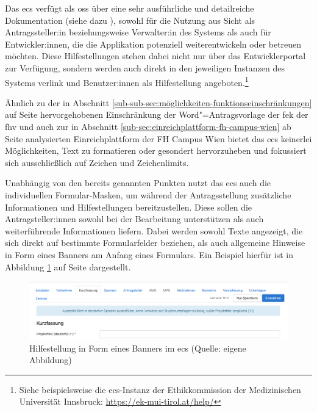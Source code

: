\documentclass[a4paper,12pt,twoside]{scrreprt}
\begin{document}
Das \acl{ecs} verfügt als \ac{oss} über eine sehr ausführliche und detailreiche Dokumentation (siehe dazu \cite{medizinische_universitat_wien_ecs_2021-1, medizinische_universitat_wien_development_2021, medizinische_universitat_wien_installationusage_2021, medizinische_universitat_wien_ecs_2021, ethics_commission_system_organization_ecs_2021}), sowohl für die Nutzung aus Sicht als Antragssteller:in beziehungsweise Verwalter:in des Systems als auch für Entwickler:innen, die die Applikation potenziell weiterentwickeln oder betreuen möchten. Diese Hilfestellungen stehen dabei nicht nur über das Entwicklerportal zur Verfügung, sondern werden auch direkt in den jeweiligen Instanzen des Systems verlink und Benutzer:innen als Hilfestellung angeboten.\footnote{Siehe beispielsweise die \ac{ecs}-Instanz der Ethikkommission der Medizinischen Universität Innsbruck: \url{https://ek-mui-tirol.at/help/}}

\medskip

Ähnlich zu der in Abschnitt \ref{sub-sub-sec:möglichkeiten-funktionseinschränkungen} auf Seite \pageref{sub-sub-sec:möglichkeiten-funktionseinschränkungen} hervorgehobenen Einschränkung der Word"=Antragsvorlage der \ac{fek} der \ac{fhv} und auch zur in Abschnitt \ref{sub-sec:einreichplattform-fh-campus-wien} ab Seite \pageref{sub-sec:einreichplattform-fh-campus-wien} analysierten Einreichplattform der FH Campus Wien bietet das \acl{ecs} keinerlei Möglichkeiten, Text zu formatieren oder gesondert hervorzuheben und fokussiert sich ausschließlich auf Zeichen und Zeichenlimits.

\medskip

Unabhängig von den bereits genannten Punkten nutzt das \ac{ecs} auch die individuellen Formular-Masken, um während der Antragsstellung zusätzliche Informationen und Hilfestellungen bereitzustellen. Diese sollen die Antragsteller:innen sowohl bei der Bearbeitung unterstützen als auch weiterführende Informationen liefern. Dabei werden sowohl Texte angezeigt, die sich direkt auf bestimmte Formularfelder beziehen, als auch allgemeine Hinweise in Form eines Banners am Anfang eines Formulars. Ein Beispiel hierfür ist in Abbildung \ref{fig:ecs-banner-hilfestellung} auf Seite \pageref{fig:ecs-banner-hilfestellung} dargestellt.

\begin{figure}[ht]
    \centering
    \includegraphics[width=\linewidth]{thesis/images/Luidold_ECS-Banner-Hilfestellung.png}
    \caption[Hilfestellung in Form eines Banners im \acl{ecs}]{Hilfestellung in Form eines Banners im \acl{ecs} (Quelle: eigene Abbildung)}
    \label{fig:ecs-banner-hilfestellung}
\end{figure}
\end{document}
